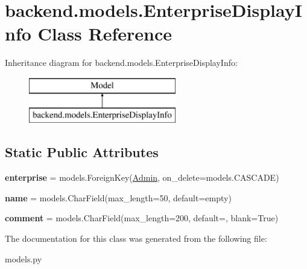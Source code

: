 \hypertarget{classbackend_1_1models_1_1_enterprise_display_info}{}\section{backend.\+models.\+Enterprise\+Display\+Info Class Reference}
\label{classbackend_1_1models_1_1_enterprise_display_info}
Inheritance diagram for backend.\+models.\+Enterprise\+Display\+Info\+:\begin{figure}[H]
\begin{center}
\leavevmode
\includegraphics[height=2.000000cm]{classbackend_1_1models_1_1_enterprise_display_info}
\end{center}
\end{figure}
\subsection*{Static Public Attributes}
\begin{DoxyCompactItemize}
\item 
\mbox{\label{classbackend_1_1models_1_1_enterprise_display_info_a9ea91f67e8567166cddc5ec8732faaf5}} 
{\bfseries enterprise} = models.\+Foreign\+Key(\textquotesingle{}\hyperlink{classbackend_1_1models_1_1_admin}{Admin}\textquotesingle{}, on\+\_\+delete=models.\+C\+A\+S\+C\+A\+DE)
\item 
\mbox{\label{classbackend_1_1models_1_1_enterprise_display_info_a6940007546968826af9eadc523c6c9cc}} 
{\bfseries name} = models.\+Char\+Field(max\+\_\+length=50, default=\textquotesingle{}empty\textquotesingle{})
\item 
\mbox{\label{classbackend_1_1models_1_1_enterprise_display_info_a1e0f27692b566dcb1dda1d9ae087fd41}} 
{\bfseries comment} = models.\+Char\+Field(max\+\_\+length=200, default=\textquotesingle{}\textquotesingle{}, blank=True)
\end{DoxyCompactItemize}


The documentation for this class was generated from the following file\+:\begin{DoxyCompactItemize}
\item 
models.\+py\end{DoxyCompactItemize}
